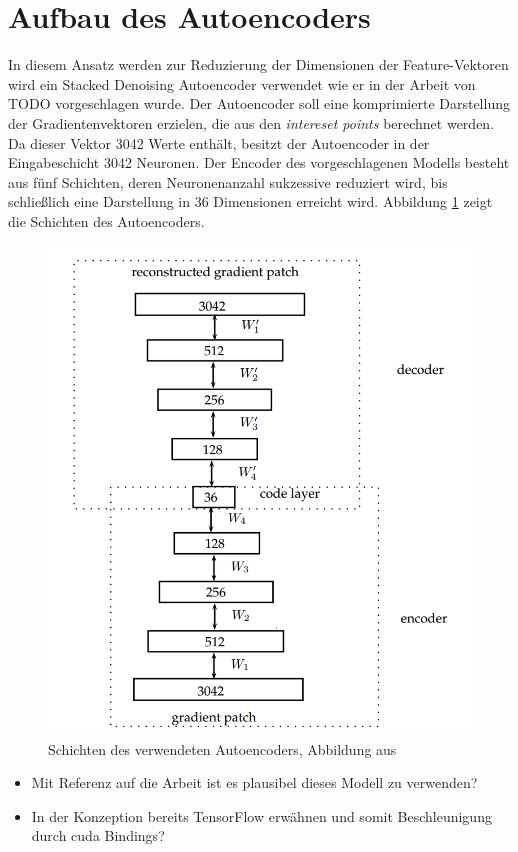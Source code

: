 \section{Aufbau des Autoencoders}

In diesem Ansatz werden zur Reduzierung der Dimensionen der Feature-Vektoren wird ein Stacked Denoising Autoencoder verwendet wie er in der Arbeit von TODO \cite{aed2016} vorgeschlagen wurde. Der Autoencoder soll eine komprimierte Darstellung der Gradientenvektoren erzielen, die aus den \textit{intereset points} berechnet werden. Da dieser Vektor 3042 Werte enthält, besitzt der Autoencoder in der Eingabeschicht 3042 Neuronen. Der Encoder des vorgeschlagenen Modells besteht aus fünf Schichten, deren Neuronenanzahl sukzessive reduziert wird, bis schließlich eine Darstellung in 36 Dimensionen erreicht wird. Abbildung \ref{img:ae_model} zeigt die Schichten des Autoencoders.

\begin{figure}
	\centering
	\includegraphics[scale=0.6]{images/ae_model.png}
	\caption{Schichten des verwendeten Autoencoders, Abbildung aus \cite{aed2016}}
	\label{img:ae_model}
\end{figure}

\begin{itemize}
	\item Mit Referenz auf die Arbeit ist es plausibel dieses Modell zu verwenden?
	\item In der Konzeption bereits TensorFlow erwähnen und somit Beschleunigung durch cuda Bindings?
\end{itemize}